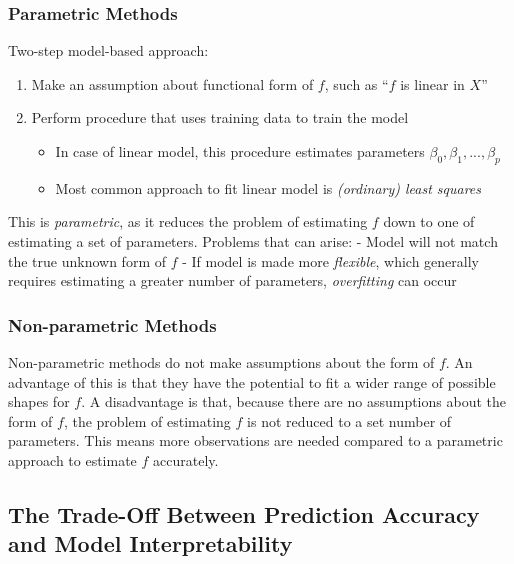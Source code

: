 \documentclass[]{book}
\providecommand{\tightlist}{%
  \setlength{\itemsep}{0pt}\setlength{\parskip}{0pt}}
\theoremstyle{definition}
\theoremstyle{definition}
\theoremstyle{definition}
\theoremstyle{remark}
\begin{document}
\subsubsection{Parametric Methods}\label{parametric-methods}

Two-step model-based approach:

\begin{enumerate}
\def\labelenumi{\arabic{enumi}.}
\tightlist
\item
  Make an assumption about functional form of \(f\), such as ``\(f\) is
  linear in \(X\)''
\item
  Perform procedure that uses training data to train the model

  \begin{itemize}
  \tightlist
  \item
    In case of linear model, this procedure estimates parameters
    \(β_0, β_1, ..., β_p\)
  \item
    Most common approach to fit linear model is \emph{(ordinary) least
    squares}
  \end{itemize}
\end{enumerate}

This is \emph{parametric}, as it reduces the problem of estimating \(f\)
down to one of estimating a set of parameters. Problems that can arise:
- Model will not match the true unknown form of \(f\) - If model is made
more \emph{flexible}, which generally requires estimating a greater
number of parameters, \emph{overfitting} can occur

\subsubsection{Non-parametric Methods}\label{non-parametric-methods}

Non-parametric methods do not make assumptions about the form of \(f\).
An advantage of this is that they have the potential to fit a wider
range of possible shapes for \(f\). A disadvantage is that, because
there are no assumptions about the form of \(f\), the problem of
estimating \(f\) is not reduced to a set number of parameters. This
means more observations are needed compared to a parametric approach to
estimate \(f\) accurately.

\subsection{The Trade-Off Between Prediction Accuracy and Model
Interpretability}\label{the-trade-off-between-prediction-accuracy-and-model-interpretability}
\end{document}

